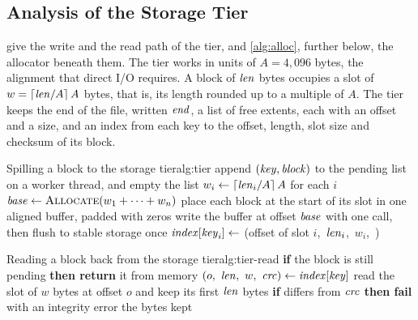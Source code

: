 \subsection{Analysis of the Storage Tier}
\label{sec:proofs-storage}

 give the write and the read path of the tier,
and \cref{alg:alloc}, further below, the allocator beneath them. The tier
works in units of
$A = 4{,}096$ bytes, the alignment that direct I/O requires. A block of
$\mathit{len}$ bytes occupies a slot of $w = \lceil \mathit{len} / A \rceil\, A$
bytes, that is, its length rounded up to a multiple of $A$. The tier keeps
the end of the file, written $\mathit{end}$, a list of free extents, each with
an offset and a size, and an index from each key to the offset, length, slot
 size and checksum of its block.

\begin{pseudocode}{Spilling a block to the storage tier}{alg:tier}
    \State append $(\mathit{key}, \mathit{block})$ to the pending list
     
      \State {} on a worker thread, and empty the list
    \EndIf
  \EndFunction
    \State $w_i \gets \lceil \mathit{len}_i / A \rceil\, A$ for each $i$ 
    \State $\var{base} \gets \Call{Allocate}{w_1 + \dots + w_n}$ 
    \State place each block at the start of its slot in one aligned buffer, padded with zeros
    \State write the buffer at offset $\mathit{base}$ with one call, then flush to stable storage once
      \State $\mathit{index}[\mathit{key}_i] \gets$ (offset of slot $i$,\ $\mathit{len}_i$,\ $w_i$,\ )
    \EndFor
  \EndFunction
\end{pseudocode}

\begin{pseudocode}{Reading a block back from the storage tier}{alg:tier-read}
    \State \textbf{if} the block is still pending \textbf{then return} it from memory
    \State $(o,\ \mathit{len},\ w,\ \mathit{crc}) \gets \mathit{index}[\mathit{key}]$
    \State read the slot of $w$ bytes at offset $o$ and keep its first $\mathit{len}$ bytes
    \State \textbf{if}  differs from $\mathit{crc}$ \textbf{then fail} with an integrity error
    \State \Return the bytes kept
  \EndFunction
\end{pseudocode}

